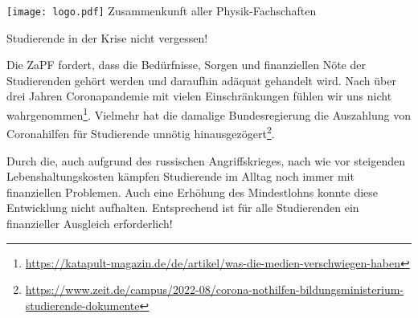 \documentclass[DIV=calc]{scrartcl}
\begin{document}
\hspace{0.87\textwidth}
\begin{minipage}{120pt}
	\vspace{-1.8cm}
	\texttt{[image: logo.pdf]}
	\centering
	\small Zusammenkunft aller Physik-Fachschaften
\end{minipage}

\begin{center}
  \huge{Studierende in der Krise nicht vergessen!}\vspace{.25\baselineskip}\\
  \normalsize
\end{center}
\vspace{1cm}







Die ZaPF fordert, dass die Bedürfnisse, Sorgen und finanziellen Nöte der Studierenden gehört werden und daraufhin adäquat gehandelt wird. Nach über drei Jahren Coronapandemie mit vielen Einschränkungen fühlen wir uns nicht wahrgenommen\footnote{\url{https://katapult-magazin.de/de/artikel/was-die-medien-verschwiegen-haben}}.
Vielmehr hat die damalige Bundesregierung die Auszahlung von Coronahilfen für Studierende unnötig hinausgezögert\footnote{\url{https://www.zeit.de/campus/2022-08/corona-nothilfen-bildungsministerium-studierende-dokumente}}.

Durch die, auch aufgrund des russischen Angriffskrieges, nach wie vor steigenden Lebenshaltungskosten kämpfen Studierende im Alltag noch immer mit finanziellen Problemen. Auch eine Erhöhung des Mindestlohns konnte diese Entwicklung nicht aufhalten. Entsprechend ist für alle Studierenden ein finanzieller Ausgleich erforderlich!
\end{document}
